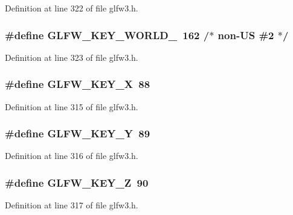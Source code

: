 Definition at line 322 of file glfw3.\-h.

\hypertarget{group__keys_ga20494bfebf0bb4fc9503afca18ab2c5e}{
\subsubsection[{G\-L\-F\-W\-\_\-\-K\-E\-Y\-\_\-\-W\-O\-R\-L\-D\-\_\-2}]{\setlength{\rightskip}{0pt plus 5cm}\#define G\-L\-F\-W\-\_\-\-K\-E\-Y\-\_\-\-W\-O\-R\-L\-D\-\_~162 /$\ast$ non-\/U\-S \#2 $\ast$/}}\label{group__keys_ga20494bfebf0bb4fc9503afca18ab2c5e}


Definition at line 323 of file glfw3.\-h.

\hypertarget{group__keys_gac1c42c0bf4192cea713c55598b06b744}{
\subsubsection[{G\-L\-F\-W\-\_\-\-K\-E\-Y\-\_\-\-X}]{\setlength{\rightskip}{0pt plus 5cm}\#define G\-L\-F\-W\-\_\-\-K\-E\-Y\-\_\-\-X~88}}\label{group__keys_gac1c42c0bf4192cea713c55598b06b744}


Definition at line 315 of file glfw3.\-h.

\hypertarget{group__keys_gafd9f115a549effdf8e372a787c360313}{
\subsubsection[{G\-L\-F\-W\-\_\-\-K\-E\-Y\-\_\-\-Y}]{\setlength{\rightskip}{0pt plus 5cm}\#define G\-L\-F\-W\-\_\-\-K\-E\-Y\-\_\-\-Y~89}}\label{group__keys_gafd9f115a549effdf8e372a787c360313}


Definition at line 316 of file glfw3.\-h.

\hypertarget{group__keys_gac489e208c26afda8d4938ed88718760a}{
\subsubsection[{G\-L\-F\-W\-\_\-\-K\-E\-Y\-\_\-\-Z}]{\setlength{\rightskip}{0pt plus 5cm}\#define G\-L\-F\-W\-\_\-\-K\-E\-Y\-\_\-\-Z~90}}\label{group__keys_gac489e208c26afda8d4938ed88718760a}


Definition at line 317 of file glfw3.\-h.

